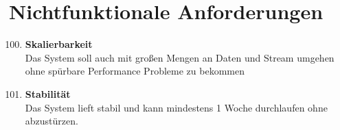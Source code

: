 \chapter{Nichtfunktionale Anforderungen}
\begin{enumerate}[label=\textbf{NF\arabic{enumi}0}]
	\setcounter{enumi}{99}
	
	\item \textbf{Skalierbarkeit}\\
	Das System soll auch mit großen Mengen an Daten und Stream umgehen ohne spürbare Performance Probleme zu bekommen
	
	\item \textbf{Stabilität}\\  
	Das System lieft stabil und kann mindestens 1 Woche durchlaufen ohne abzustürzen.

\end{enumerate}
	